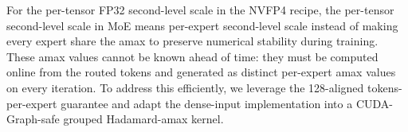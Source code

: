For the per-tensor FP32 second-level scale in the NVFP4 recipe, the per-tensor second-level scale in MoE means per-expert second-level scale instead of making every expert share the amax to preserve numerical stability during training. These amax values cannot be known ahead of time: they must be computed online from the routed tokens and generated as distinct per-expert amax values on every iteration. To address this efficiently, we leverage the 128-aligned tokens-per-expert guarantee and adapt the dense-input implementation into a CUDA-Graph-safe grouped Hadamard-amax kernel. 


